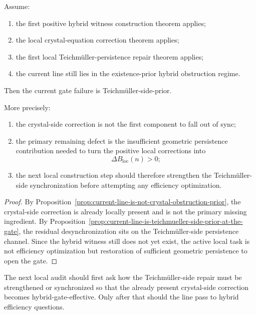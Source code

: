 \begin{theorem}
\label{thm:first-gate-side-desynchronization-orientation-theorem}
Assume:
\begin{enumerate}[leftmargin=2em,label=(\alph*)]
  \item the first positive hybrid witness construction theorem applies;
  \item the local crystal-equation correction theorem applies;
  \item the first local Teichm\"uller-persistence repair theorem applies;
  \item the current line still lies in the existence-prior hybrid obstruction regime.
\end{enumerate}
Then the current gate failure is Teichm\"uller-side-prior.

More precisely:
\begin{enumerate}[leftmargin=2em,label=(\roman*)]
  \item the crystal-side correction is not the first component to fall out of sync;
  \item the primary remaining defect is the insufficient geometric persistence contribution needed to turn the positive local corrections into
  \[
    \Delta B_{\mathrm{loc}}(n)>0;
  \]
  \item the next local construction step should therefore strengthen the Teichm\"uller-side synchronization before attempting any efficiency optimization.
\end{enumerate}
\end{theorem}

\begin{proof}
By Proposition~\ref{prop:current-line-is-not-crystal-obstruction-prior}, the crystal-side correction is already locally present and is not the primary missing ingredient.
By Proposition~\ref{prop:current-line-is-teichmueller-side-prior-at-the-gate}, the residual desynchronization sits on the Teichm\"uller-side persistence channel.
Since the hybrid witness still does not yet exist, the active local task is not efficiency optimization but restoration of sufficient geometric persistence to open the gate.
\end{proof}

\begin{corollary}
\label{cor:current-gate-side-working-rule}
The next local audit should first ask how the Teichm\"uller-side repair must be strengthened or synchronized so that the already present crystal-side correction becomes hybrid-gate-effective.
Only after that should the line pass to hybrid efficiency questions.
\end{corollary}

